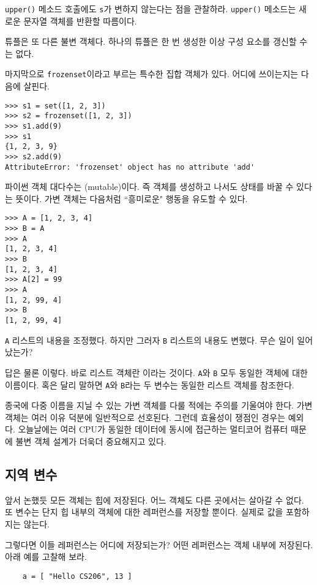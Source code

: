 \documentclass[a4paper]{oblivoir}
\begin{document}
\noindent\texttt{upper()} 메소드 호출에도 \texttt{s}가 변하지 않는다는 점을 관찰하라. \texttt{upper()} 메소드는 새로운 문자열 객체를 반환할 따름이다.

튜플은 또 다른 불변 객체다. 하나의 튜플은 한 번 생성한 이상 구성 요소를 갱신할 수는 없다.

마지막으로 \texttt{frozenset}이라고 부르는 특수한 집합 객체가 있다. 어디에 쓰이는지는 다음에 살핀다.

\begin{lstlisting}
>>> s1 = set([1, 2, 3])
>>> s2 = frozenset([1, 2, 3])
>>> s1.add(9)
>>> s1
{1, 2, 3, 9}
>>> s2.add(9)
AttributeError: 'frozenset' object has no attribute 'add'
\end{lstlisting}

파이썬 객체 대다수는 (mutable)이다. 즉 객체를 생성하고 나서도 상태를 바꿀 수 있다는 뜻이다. 가변 객체는 다음처럼 ``흥미로운" 행동을 유도할 수 있다.

\begin{lstlisting}
>>> A = [1, 2, 3, 4]
>>> B = A
>>> A
[1, 2, 3, 4]
>>> B
[1, 2, 3, 4]
>>> A[2] = 99
>>> A
[1, 2, 99, 4]
>>> B
[1, 2, 99, 4]
\end{lstlisting}

\texttt{A} 리스트의 내용을 조정했다. 하지만 그러자 \texttt{B} 리스트의 내용도 변했다. 무슨 일이 일어났는가?

답은 물론 이렇다. 바로 리스트 객체란 이라는 것이다. \texttt{A}와 \texttt{B} 모두 동일한 객체에 대한 이름이다. 혹은 달리 말하면 \texttt{A}와 \texttt{B}라는 두 변수는 동일한 리스트 객체를 참조한다. 

종국에 다중 이름을 지닐 수 있는 가변 객체를 다룰 적에는 주의를 기울여야 한다. 가변 객체는 여러 이유 덕분에 일반적으로 선호된다. 그런데 효율성이 쟁점인 경우는 예외다. 오늘날에는 여러 CPU가 동일한 데이터에 동시에 접근하는 멀티코어 컴퓨터 때문에 불변 객체 설계가 더욱더 중요해지고 있다.

\subsection*{지역 변수}

앞서 논했듯 모든 객체는 힙에 저장된다. 어느 객체도 다른 곳에서는 살아갈 수 없다. 또 변수는 단지 힙 내부의 객체에 대한 레퍼런스를 저장할 뿐이다. 실제로 값을 포함하지는 않는다.

그렇다면 이들 레퍼런스는 어디에 저장되는가? 어떤 레퍼런스는 객체 내부에 저장된다. 아래 예를 고찰해 보라.

\begin{verbatim}
    a = [ "Hello CS206", 13 ]
\end{verbatim}
\end{document}
